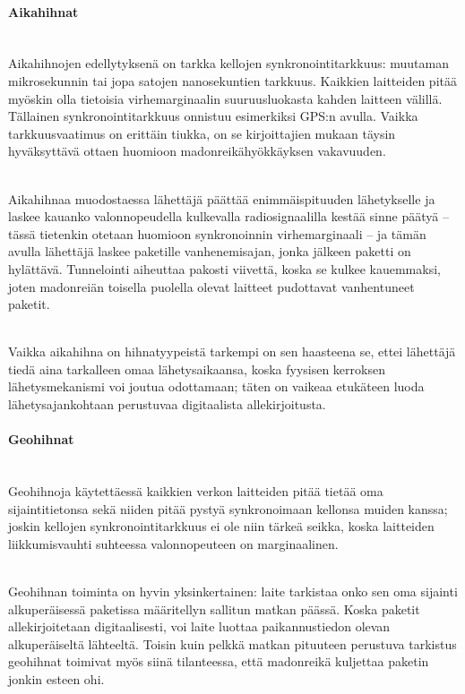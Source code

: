 \documentclass[finnish]{tktltiki2}
\theoremstyle{definition}
\theoremstyle{remark}
\begin{document}
\paragraph{Aikahihnat} 
\noindent \\
Aikahihnojen edellytyksenä on tarkka kellojen synkronointitarkkuus: muutaman mikrosekunnin tai jopa satojen nanosekuntien tarkkuus. Kaikkien laitteiden pitää myöskin olla tietoisia virhemarginaalin suuruusluokasta kahden laitteen välillä. Tällainen synkronointitarkkuus onnistuu esimerkiksi GPS:n avulla. Vaikka tarkkuusvaatimus on erittäin tiukka, on se kirjoittajien mukaan täysin hyväksyttävä ottaen huomioon madonreikähyökkäyksen vakavuuden.

\noindent \\
Aikahihnaa muodostaessa lähettäjä päättää enimmäispituuden lähetykselle ja laskee kauanko valonnopeudella kulkevalla radiosignaalilla kestää sinne päätyä – tässä tietenkin otetaan huomioon synkronoinnin virhemarginaali – ja tämän avulla lähettäjä laskee paketille vanhenemisajan, jonka jälkeen paketti on hylättävä. Tunnelointi aiheuttaa pakosti viivettä, koska se kulkee kauemmaksi, joten madonreiän toisella puolella olevat laitteet pudottavat vanhentuneet paketit.

\noindent \\
Vaikka aikahihna on hihnatyypeistä tarkempi on sen haasteena se, ettei lähettäjä tiedä aina tarkalleen omaa lähetysaikaansa, koska fyysisen kerroksen lähetysmekanismi voi joutua odottamaan; täten on vaikeaa etukäteen luoda lähetysajankohtaan perustuvaa digitaalista allekirjoitusta.

\paragraph{Geohihnat}
\noindent \\
Geohihnoja käytettäessä kaikkien verkon laitteiden pitää tietää oma sijaintitietonsa sekä niiden pitää pystyä synkronoimaan kellonsa muiden kanssa; joskin kellojen synkronointitarkkuus ei ole niin tärkeä seikka, koska laitteiden liikkumisvauhti suhteessa valonnopeuteen on marginaalinen.

\noindent \\
Geohihnan toiminta on hyvin yksinkertainen: laite tarkistaa onko sen oma sijainti alkuperäisessä paketissa määritellyn sallitun matkan päässä. Koska paketit allekirjoitetaan digitaalisesti, voi laite luottaa paikannustiedon olevan alkuperäiseltä lähteeltä. Toisin kuin pelkkä matkan pituuteen perustuva tarkistus geohihnat toimivat myös siinä tilanteessa, että madonreikä kuljettaa paketin jonkin esteen ohi.
\end{document}
